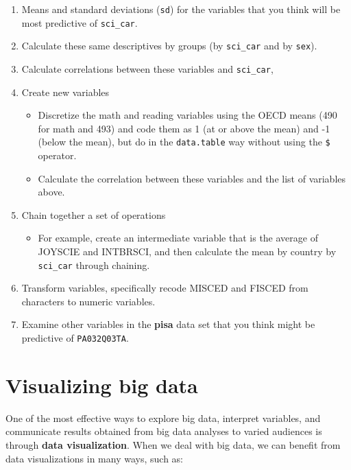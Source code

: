 \documentclass[]{book}
\providecommand{\tightlist}{%
  \setlength{\itemsep}{0pt}\setlength{\parskip}{0pt}}
\begin{document}
\begin{enumerate}
\def\labelenumi{\arabic{enumi}.}
\setcounter{enumi}{2}
\item
  Means and standard deviations (\texttt{sd}) for the variables that you think will be most predictive of \texttt{sci\_car}.
\item
  Calculate these same descriptives by groups (by \texttt{sci\_car} and by \texttt{sex}).
\item
  Calculate correlations between these variables and \texttt{sci\_car},
\item
  Create new variables

  \begin{itemize}
  \tightlist
  \item
    Discretize the math and reading variables using the OECD means (490 for math and 493) and code them as 1 (at or above the mean) and -1 (below the mean), but do in the \texttt{data.table} way without using the \texttt{\$} operator.
  \item
    Calculate the correlation between these variables and the list of variables above.
  \end{itemize}
\item
  Chain together a set of operations

  \begin{itemize}
  \tightlist
  \item
    For example, create an intermediate variable that is the average of JOYSCIE and INTBRSCI, and then calculate the mean by country by \texttt{sci\_car} through chaining.
  \end{itemize}
\item
  Transform variables, specifically recode MISCED and FISCED from characters to numeric variables.
\item
  Examine other variables in the \textbf{pisa} data set that you think might be predictive of \texttt{PA032Q03TA}.
\end{enumerate}

\hypertarget{visualizing-big-data}{%
\chapter{Visualizing big data}\label{visualizing-big-data}}

One of the most effective ways to explore big data, interpret variables, and communicate results obtained from big data analyses to varied audiences is through \textbf{data visualization}. When we deal with big data, we can benefit from data visualizations in many ways, such as:
\end{document}
